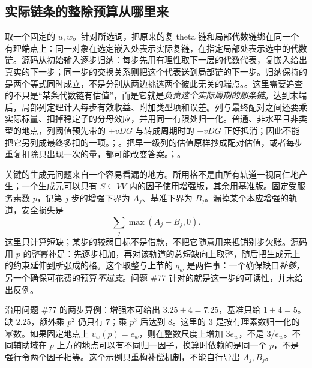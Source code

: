 \subsection{实际链条的整除预算从哪里来}
取一个固定的 $u,w$。针对所选词，把原来的复 theta 链和局部代数链绑在同一个有理端点上：同一对象在选定嵌入处表示实际复链，在指定局部处表示选中的代数链。源码从初始输入逐步归纳：每步先用有理性取下一层的代数代表，复嵌入给出真实的下一步；同一步的交换关系则把这个代表送到局部链的下一步。归纳保持的是两个等式同时成立，不是分别从两边挑选两个彼此无关的端点。。这里需要追查的不只是“某条代数链有估值”，而是它就是\emph{负责这个实际周期的那条链}。达到末端后，局部列定理计入每步有效收益、附加类型项和误差。列与最终配对之间还要乘实际标量、扣掉稳定子的分母效应，并用同一有限处归一化。普通、非水平且非类型的地点，列阈值预先带的 $+vDG$ 与转成周期时的 $-vDG$ 正好抵消；因此不能把它另列成最终多扣的一项。；。把早一级列的估值原样抄成配对估值，或者每步重复扣除只出现一次的量，都可能改变答案。；。

关键的生成元问题来自一个容易看漏的地方。所用格不是由所有轨道一视同仁地产生；一个生成元可以只有 $S\subseteq VV$ 内的因子使用增强版，其余用基准版。固定受服务素数 $p$，记第 $j$ 步的增强下界为 $A_j$、基准下界为 $B_j$。漏掉某个本应增强的轨道，安全损失是
\[
            \sum_j \max(A_j-B_j,0).
\]
这里只计算短缺；某步的较弱目标不是借款，不把它随意用来抵销别步欠账。源码用 $p$ 的整幂补足：先逐步相加，再对该轨道的总短缺向上取整，随后把生成元上的约束延伸到所张成的格。这个取整与上节的 $q_w$ 是两件事：一个确保缺口\emph{补够}，另一个确保可花费的预算\emph{不过支}。\href{https://github.com/leanprover-community/riemann-hypothesis/issues/77}{问题 \#77} 针对的就是这一步的可读性，并未给出反例。

沿用问题 \#77 的两步算例：增强本可给出 $3.25+4=7.25$，基准只给 $1+4=5$。缺 $2.25$，额外乘 $p^2$ 仍只有 $7$；乘 $p^3$ 后达到 $8$。这里的 $3$ 是按有理素数归一化的幂数。如果固定地点上 $v_w(p)=e_w$，则在整数尺度上增加 $3e_w$，不是 $3/e_w$。不同辅助域在 $p$ 上方的地点可以有不同归一因子，换算时依赖的是同一个 $p$，不是强行令两个因子相等。这个示例只重构补偿机制，不能自行导出 $A_j,B_j$。

